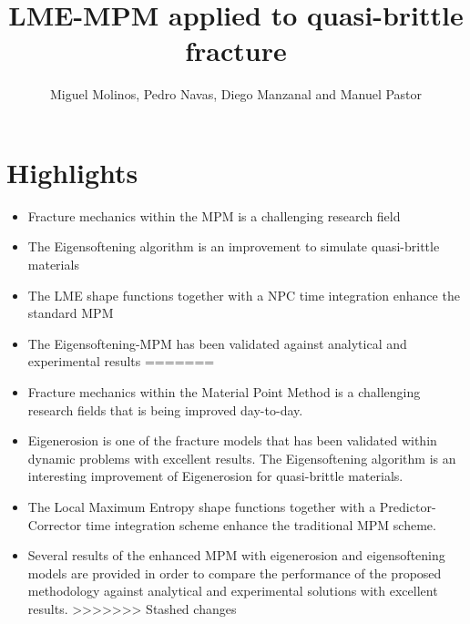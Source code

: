 \documentclass[12pt,a4paper]{article}
\title{LME-MPM applied to quasi-brittle fracture}
\author{Miguel Molinos, Pedro Navas, Diego Manzanal and Manuel Pastor}
\begin{document}
\maketitle

\centering
\section*{Highlights}
\setlength{\parskip}{1cm plus 5mm minus 4mm}
\begin{itemize}
<<<<<<< Updated upstream
\item Fracture mechanics within the MPM is a challenging research field

\item The Eigensoftening algorithm is an improvement to simulate quasi-brittle materials

\item The LME shape functions together with a NPC time integration enhance the standard MPM

\item The Eigensoftening-MPM has been validated against analytical and experimental results
=======
\item Fracture mechanics within the Material Point Method is a challenging research fields that is being improved day-to-day.

\item Eigenerosion is one of the fracture models that has been validated within dynamic problems with excellent results. The Eigensoftening algorithm is an interesting improvement of Eigenerosion for quasi-brittle materials.

\item The Local Maximum Entropy shape functions together with a Predictor-Corrector time integration scheme enhance the traditional MPM scheme.

\item Several results of the enhanced MPM with eigenerosion and eigensoftening models are provided in order to compare the performance of the proposed methodology against analytical and experimental solutions with excellent results.
>>>>>>> Stashed changes

\end{itemize}
\end{document}
